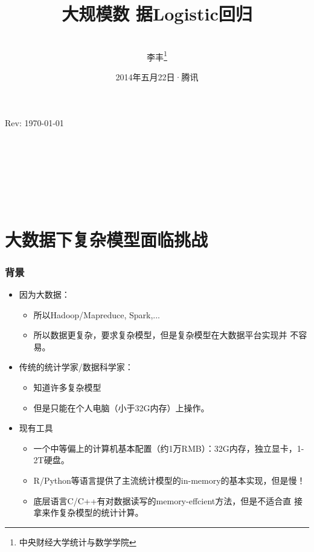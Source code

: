 \documentclass[10pt]{beamer}
\title[High Performance Computing with Big Data]{{\textbf{大规模数
      据Logistic回归}}}
\author[李丰]{\\李丰\footnote{中央财经大学统计与数学学院}}
\institute[]{\texttt{[image: cufelogo]}}
\date{2014年五月22日·腾讯}
\begin{document}
\begin{frame}[plain]
  \titlepage
  \tiny{Rev: \today}
\end{frame}


\section*{~}
\begin{frame}
  \frametitle{~}
  \tableofcontents
\end{frame}

\section{大数据下复杂模型面临挑战}
\begin{frame}
  \frametitle{背景}

  \begin{itemize}


  \item 因为大数据：

    \begin{itemize}
    \item 所以Hadoop/Mapreduce, Spark,...

    \item 所以数据更复杂，要求复杂模型，但是复杂模型在大数据平台实现并
      不容易。
    \end{itemize}
  \item 传统的统计学家/数据科学家：

    \begin{itemize}
    \item 知道许多复杂模型

    \item 但是只能在个人电脑（小于32G内存）上操作。
    \end{itemize}

  \item 现有工具

    \begin{itemize}
    \item 一个中等偏上的计算机基本配置（约1万RMB）：32G内存，独立显卡，1-2T硬盘。
    \item R/Python等语言提供了主流统计模型的in-memory的基本实现，但是慢！
    \item 底层语言C/C++有对数据读写的memory-effcient方法，但是不适合直
      接拿来作复杂模型的统计计算。
    \end{itemize}

  \end{itemize}

\end{frame}
\end{document}
